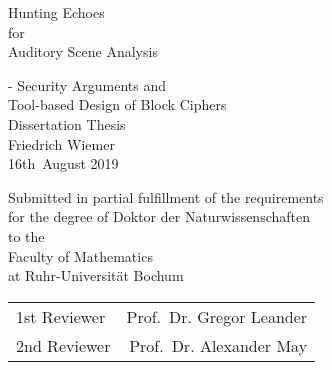 \thispagestyle{empty}
{
    \begin{fullwidth}
        \centering
        \hphantom{.}
        \vfill
        {\Huge
            Hunting Echoes\\
            for\\
            Auditory Scene Analysis
        }
        \vfill
        \vfill
    \end{fullwidth}
}

\clearpage{}

\cleardoublepage{}

\thispagestyle{empty}
{
    \calccentering{\unitlength}
    \begin{adjustwidth*}{\unitlength}{-\unitlength}
        \raggedleft{}
        {\Huge\color{Burgundy}%
        Security Arguments and\\
        Tool-based Design of Block Ciphers}\\[\baselineskip]
        {\LARGE%
        Dissertation Thesis}\\[0.2\textheight]
        {\huge%
        Friedrich Wiemer}\\[\baselineskip]
        {\LARGE%
        16th~August 2019}
        \vfill
        \vfill
        {\large%
        Submitted in partial fulfillment of the requirements\\
        for the degree of Doktor der Naturwissenschaften\\[\baselineskip]%

        to the\\[\baselineskip]

        Faculty of Mathematics\\
        at Ruhr-Universität Bochum\\[2\baselineskip]

        \begin{minipage}{0.5\textwidth}
        \begin{tabular}{lr}
            1st\hspace{4pt} Reviewer & Prof.\ Dr. Gregor Leander\\
            2nd Reviewer & Prof.\ Dr.\; Alexander May
        \end{tabular}
        \end{minipage}
        \hspace*{36pt}

        \vfill
        }
        \vspace*{\baselineskip}
    \end{adjustwidth*}
}
